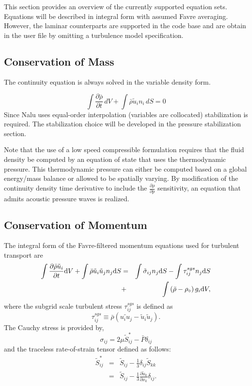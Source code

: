This section provides an overview of the currently supported
equation sets. Equations will be described in integral form with
assumed Favre averaging. However, the laminar counterparts
are supported in the code base and are obtain in the user file
by omitting a turbulence model specification. 

\subsection{Conservation of Mass}
The continuity equation is always solved in the variable density form.

\begin{equation}
\int \frac{\partial \bar{\rho}} {\partial t}\, dV
+ \int \bar{\rho} \tilde{u}_i  n_i\, dS = 0
\end{equation}
Since Nalu uses equal-order interpolation (variables are collocated)
stabilization is required. The stabilization choice will be developed
in the pressure stabilization section.

Note that the use of a low speed compressible formulation requires that 
the fluid density be computed by an equation of state that uses the 
thermodynamic pressure. This thermodynamic pressure can either be computed
based on a global energy/mass balance or allowed to be spatially varying.
By modification of the continuity density time derivative to include 
the $\frac{\partial \rho}{\partial p}$ sensitivity,
an equation that admits acoustic pressure waves is realized.

\subsection{Conservation of Momentum}

The integral form of the Favre-filtered momentum equations used for
turbulent transport are
%
\begin{eqnarray}
   \int {{\partial \bar{\rho} \tilde{u}_i} \over {\partial t}} {\rm d}V
  +  \int \bar{\rho} \tilde{u}_i \tilde{u}_j n_j {\rm d}S 
   &=& 
   \int \tilde{\sigma}_{ij} n_j {\rm d}S 
  - \int \tau^{sgs}_{ij} n_j {\rm d}S \nonumber \\ 
   &+& \int \left(\bar{\rho} - \rho_{\circ} \right) g_i {\rm d}V,
\label{fav-mom}
\end{eqnarray}
%
where the subgrid scale turbulent stress $\tau^{sgs}_{ij}$ is defined as
%
\begin{equation}
\tau^{sgs}_{ij} \equiv \bar{\rho} ( \widetilde{u_i u_j} - 
     \tilde{u}_i \tilde{u}_j ).
\label{sgsStress}
\end{equation}
%
The Cauchy stress is provided by,
\begin{equation}
\sigma_{ij}  = 2 \mu \tilde S^*_{ij} - \bar P \delta_{ij}
\end{equation}
%
and the traceless rate-of-strain tensor defined as follows:
\begin{eqnarray}
\tilde S^*_{ij}  &=& \tilde S_{ij} - \frac{1}{3} \delta_{ij} \tilde S_{kk} \nonumber \\
		     &=& \tilde S_{ij} - \frac{1}{3} \frac{\partial \tilde u_k }{\partial x_k}\delta_{ij}.
\end{eqnarray}

